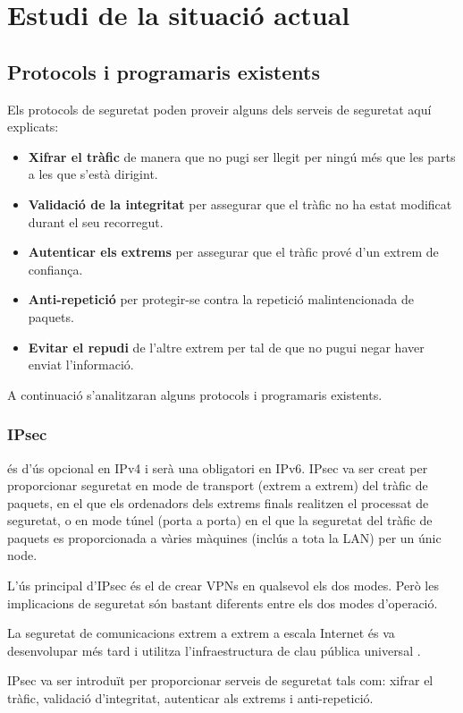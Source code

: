 \chapter{Estudi de la situació actual}
\section{Protocols i programaris existents}
Els protocols de seguretat poden proveir alguns dels serveis de seguretat aquí explicats:
\begin{itemize}
\item \textbf{Xifrar el tràfic} de manera que no pugi ser llegit per ningú més que les parts a les que s'està dirigint.
\item \textbf{Validació de la integritat} per assegurar que el tràfic no ha estat modificat durant el seu recorregut.
\item \textbf{Autenticar els extrems} per assegurar que el tràfic prové d'un extrem de confiança.
\item \textbf{Anti-repetició} per protegir-se contra la repetició malintencionada de paquets.
\item \textbf{Evitar el repudi} de l'altre extrem per tal de que no pugui negar haver enviat l'informació.
\end{itemize}

A continuació s'analitzaran alguns protocols i programaris existents.
\subsection{IPsec}
 és d'ús opcional en IPv4 i serà una obligatori en IPv6. IPsec va ser creat per proporcionar seguretat en mode de transport (extrem a extrem) del tràfic de paquets, en el que els ordenadors dels extrems finals realitzen el processat de seguretat, o en mode túnel (porta a porta) en el que la seguretat del tràfic de paquets es proporcionada a vàries màquines (inclús a tota la LAN) per un únic node.

L'ús principal d'IPsec és el de crear VPNs en qualsevol els dos modes. Però les implicacions de seguretat són bastant diferents entre els dos modes d'operació.

La seguretat de comunicacions extrem a extrem a escala Internet és va desenvolupar més tard i utilitza l'infraestructura de clau pública universal .

IPsec va ser introduït per proporcionar serveis de seguretat tals com: xifrar el tràfic, validació d'integritat, autenticar als extrems i anti-repetició.

